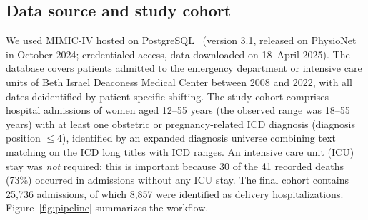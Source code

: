 \documentclass[healthcare,article,submit,pdftex,moreauthors]{Definitions/mdpi}
\begin{document}
\subsection{Data source and study cohort}
We used MIMIC-IV hosted on PostgreSQL~\cite{Johnson2023MIMICIV}
(version 3.1, released on PhysioNet in October 2024; credentialed access, data downloaded on 18~April 2025). The database covers patients admitted to the emergency department or intensive care units of Beth Israel Deaconess Medical Center between 2008 and 2022, with all dates deidentified by patient-specific shifting.
The study cohort comprises hospital admissions of women aged 12--55 years (the observed range was 18--55 years) with at
least one obstetric or pregnancy-related ICD diagnosis (diagnosis position
$\leq 4$), identified by an expanded diagnosis universe combining text matching on
the ICD long titles with ICD ranges. An intensive care unit (ICU) stay was
\emph{not} required: this is important because 30 of the 41 recorded deaths (73\%)
occurred in admissions without any ICU stay. The final cohort contains
25{,}736 admissions, of which 8{,}857 were identified as delivery hospitalizations.
Figure~\ref{fig:pipeline} summarizes the workflow.
\end{document}
